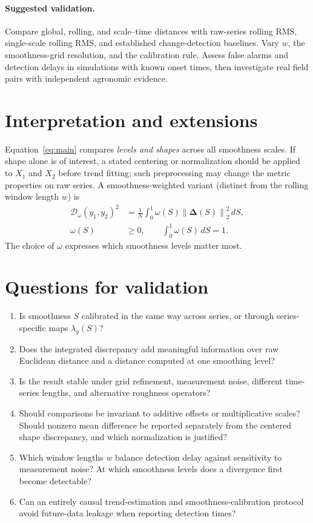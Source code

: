 \documentclass[10pt,letterpaper]{article}
\newcommand{\norm}[1]{\left\lVert#1\right\rVert}
\begin{document}
\paragraph{Suggested validation.}
Compare global, rolling, and scale--time distances with raw-series
rolling RMS, single-scale rolling RMS, and established
change-detection baselines. Vary $w$, the smoothness-grid resolution,
and the calibration rule. Assess false alarms and detection delays in
simulations with known onset times, then investigate real field pairs
with independent agronomic evidence.

\section{Interpretation and extensions}
Equation~\eqref{eq:main} compares \emph{levels and shapes} across all
smoothness scales. If shape alone is of interest, a stated centering or
normalization should be applied to $X_1$ and $X_2$ before trend fitting;
such preprocessing may change the metric properties on raw series.
A smoothness-weighted variant (distinct from the rolling window
length $w$) is
\begin{equation}
\begin{aligned}
\mathcal{D}_{\omega}(y_1,y_2)^2
 &=\frac1N\int_0^1\omega(S)
 \norm{\bm\Delta(S)}_2^2\,dS,\\
\omega(S)&\geq0,\qquad\int_0^1\omega(S)\,dS=1.
\end{aligned}
\end{equation}
The choice of $\omega$ expresses which smoothness levels matter most.

\section{Questions for validation}
\begin{enumerate}
  \item Is smoothness $S$ calibrated in the same way across series, or
    through series-specific maps $\lambda_y(S)$?
  \item Does the integrated discrepancy add meaningful information over
    raw Euclidean distance and a distance computed at one smoothing level?
  \item Is the result stable under grid refinement, measurement noise,
    different time-series lengths, and alternative roughness operators?
  \item Should comparisons be invariant to additive offsets or
    multiplicative scales? Should nonzero mean difference be reported
    separately from the centered shape discrepancy, and which
    normalization is justified?
  \item Which window lengths $w$ balance detection delay against
    sensitivity to measurement noise? At which smoothness levels does
    a divergence first become detectable?
  \item Can an entirely causal trend-estimation and smoothness-calibration
    protocol avoid future-data leakage when reporting detection times?
\end{enumerate}
\end{document}
